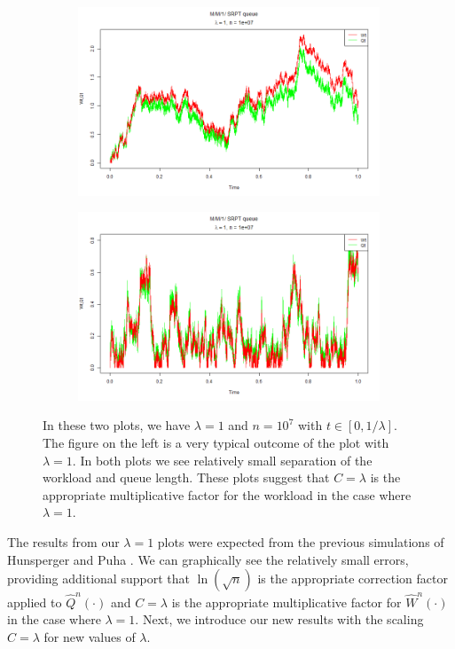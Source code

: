 \documentclass[12pt]{article}
\theoremstyle{plain}
\theoremstyle{definition}
\theoremstyle{remark}
\newcommand{\Qfhat}{\widehat{Q}^{n}(\cdot)}
\newcommand{\Wfhat}{\widehat{W}^{n}(\cdot)}
\begin{document}
\begin{figure}[H]
\begin{subfigure}{9cm}
\centering
\includegraphics[width = 9cm]{Pictures/normalPlot1_2.png}
\end{subfigure}%
\begin{subfigure}{9cm}
\centering
\includegraphics[width = 9cm]{Pictures/normalPlot1_1.png}
\end{subfigure}
\caption{In these two plots, we have $\lambda = 1$ and $n = 10^{7}$ with $t \in [0,1/\lambda]$. The figure on the left is a very typical outcome of the plot with $\lambda = 1$. In both plots we see relatively small separation of the workload and queue length. These plots suggest that $C=\lambda$ is the appropriate multiplicative factor for the workload in the case where $\lambda = 1$.}
\label{fig:normalPlot1}
\end{figure}

The results from our $\lambda = 1$ plots were expected from the previous simulations of Hunsperger and Puha \cite{puhahan12}. We can graphically see the relatively small errors, providing additional support that $\ln ( \sqrt{n})$ is the appropriate correction factor applied to $\Qfhat$ and $C = \lambda$ is the appropriate multiplicative factor for $\Wfhat$ in the case where $\lambda = 1$. Next, we introduce our new results with the scaling $C = \lambda$ for new values of $\lambda$.
\end{document}
